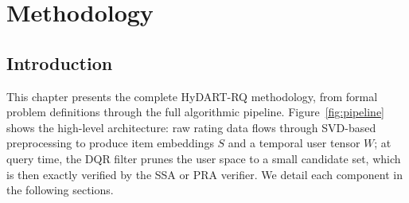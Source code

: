 \chapter{Methodology}
\label{ch:methodology}

\section{Introduction}

This chapter presents the complete HyDART-RQ methodology, from formal problem definitions through the full algorithmic pipeline. Figure~\ref{fig:pipeline} shows the high-level architecture: raw rating data flows through SVD-based preprocessing to produce item embeddings $S$ and a temporal user tensor $W$; at query time, the DQR filter prunes the user space to a small candidate set, which is then exactly verified by the SSA or PRA verifier. We detail each component in the following sections.

